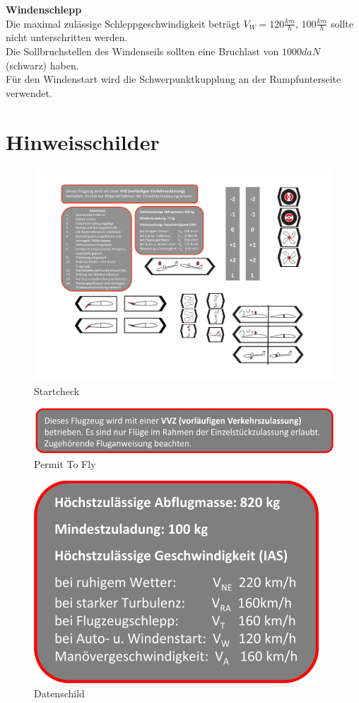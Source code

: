 \textbf{Windenschlepp}\\
Die maximal zulässige Schleppgeschwindigkeit beträgt $V_W=120\frac{km}{h}$, $100\frac{km}{h}$ sollte nicht unterschritten werden.\\
Die Sollbruchstellen des Windenseils sollten eine Bruchlast von $1000daN$ (schwarz) haben.\\
Für den Windenstart wird die Schwerpunktkupplung an der Rumpfunterseite verwendet.
\newpage
\section{Hinweisschilder}

\begin{figure}[h]
\begin{center}
\includegraphics[width=.45\textwidth]{bilder/startcheck.pdf}
\caption*{Startcheck}
\end{center}
\end{figure}

\begin{figure}[h]
\begin{center}
\includegraphics[width=.9\textwidth]{bilder/vvz.pdf}
\caption*{Permit To Fly}
\end{center}
\end{figure}

\begin{figure}[h]
\begin{center}
\includegraphics[width=.45\textwidth]{bilder/datenschild.pdf}
\caption*{Datenschild}
\end{center}
\end{figure}

